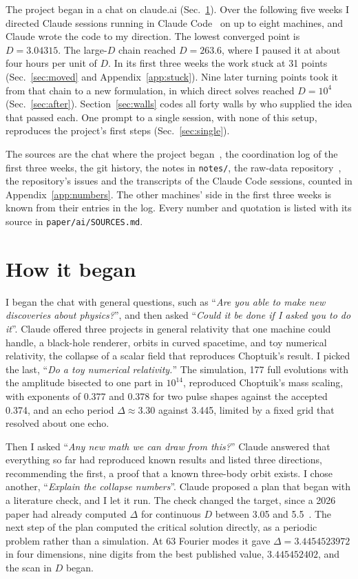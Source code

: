 \documentclass[aps,prd,onecolumn,superscriptaddress,nofootinbib,10pt]{revtex4-2}
\newcommand{\file}[1]{\texttt{#1}}
\newcommand{\prompt}[1]{``\textit{#1}''}
\begin{document}
The project began in a chat on claude.ai (Sec.~\ref{sec:origin}). Over the following five weeks I directed Claude
sessions running in Claude Code~\cite{ClaudeCode} on up to eight machines, and Claude wrote the code to my direction.
The lowest converged point is $D = 3.04315$. The large-$D$ chain reached $D = 263.6$, where I paused it at about four
hours per unit of $D$. In its first three weeks the work stuck at 31 points (Sec.~\ref{sec:moved} and
Appendix~\ref{app:stuck}). Nine later turning points took it from that chain to a new formulation, in which direct
solves reached $D = 10^4$ (Sec.~\ref{sec:after}). Section~\ref{sec:walls} codes all forty walls by who supplied the
idea that passed each. One prompt to a single session, with none of this setup, reproduces the project's first steps
(Sec.~\ref{sec:single}).

The sources are the chat where the project began~\cite{chat}, the coordination log of the first three weeks, the git
history, the notes in \file{notes/}, the raw-data repository~\cite{raw}, the repository's issues and the transcripts of
the Claude Code sessions, counted in Appendix~\ref{app:numbers}. The other machines' side in the first three weeks is
known from their entries in the log. Every number and quotation is listed with its source in \file{paper/ai/SOURCES.md}.

\section{How it began}
\label{sec:origin}

I began the chat with general questions, such as \prompt{Are you able to make new discoveries about physics?}, and then
asked \prompt{Could it be done if I asked you to do it}. Claude offered three projects in general relativity that one
machine could handle, a black-hole renderer, orbits in curved spacetime, and toy numerical relativity, the collapse of a
scalar field that reproduces Choptuik's result. I picked the last, \prompt{Do a toy numerical relativity.} The
simulation, 177 full evolutions with the amplitude bisected to one part in $10^{14}$, reproduced Choptuik's mass scaling, with exponents of 0.377 and 0.378 for two pulse shapes against the
accepted 0.374, and an echo period $\Delta \approx 3.30$ against 3.445, limited by a fixed grid that resolved about one
echo.

Then I asked \prompt{Any new math we can draw from this?} Claude answered that everything so far had reproduced known
results and listed three directions, recommending the first, a proof that a known three-body orbit exists. I chose
another, \prompt{Explain the collapse numbers}. Claude proposed a plan that began with a literature check, and I let it
run. The check changed the target, since a 2026 paper had already computed $\Delta$ for continuous $D$ between 3.05 and
5.5~\cite{EckerEtAl2026}. The next step of the plan computed the critical solution directly, as a periodic problem rather
than a simulation. At 63 Fourier modes it gave $\Delta = 3.4454523972$ in four dimensions, nine digits from the best
published value, $3.445452402$, and the scan in $D$ began.
\end{document}
